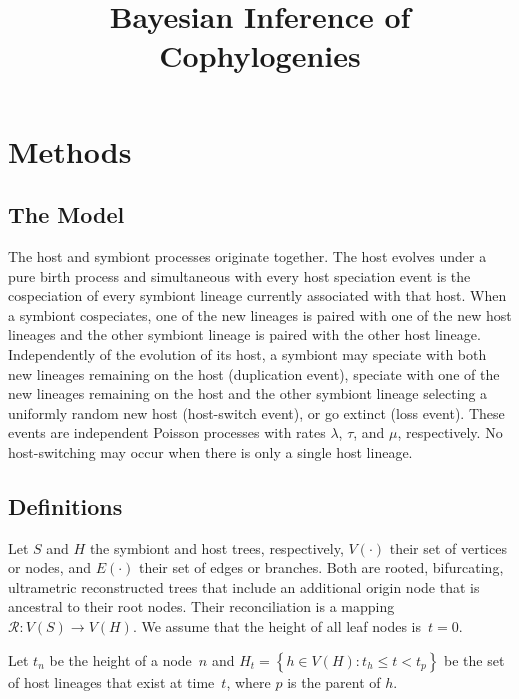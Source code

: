 \documentclass{article}
\title{Bayesian Inference of Cophylogenies}
\begin{document}
    \section*{Methods}

        \subsection*{The Model}

            The host and symbiont processes originate together. The host
            evolves under a pure birth process and simultaneous with every host
            speciation event is the cospeciation of every symbiont lineage
            currently associated with that host. When a symbiont cospeciates,
            one of the new lineages is paired with one of the new host lineages
            and the other symbiont lineage is paired with the other host
            lineage. Independently of the evolution of its host, a symbiont may
            speciate with both new lineages remaining on the host (duplication
            event), speciate with one of the new lineages remaining on the host
            and the other symbiont lineage selecting a uniformly random new
            host (host-switch event), or go extinct (loss event). These events
            are independent Poisson processes with rates $\lambda$, $\tau$, and
            $\mu$, respectively. No host-switching may occur when there is only
            a single host lineage.

        \subsection*{Definitions}

            Let $S$ and $H$ the symbiont and host trees, respectively,
            $V\left(\cdot\right)$ their set of vertices or nodes, and
            $E\left(\cdot\right)$ their set of edges or branches. Both are
            rooted, bifurcating, ultrametric reconstructed trees that include
            an additional origin node that is ancestral to their root nodes.
            Their reconciliation is a mapping $\mathcal{R} : V\left(S\right)\to
            V\left(H\right)$. We assume that the height of all leaf nodes is~$t
            = 0$.

            Let $t_n$ be the height of a node~$n$ and $H_t = \left\{h \in
            V\left(H\right) : t_h \leq t < t_p\right\}$ be the set of host
            lineages that exist at time~$t$, where $p$ is the parent of $h$.
\end{document}
